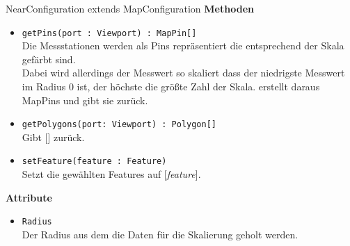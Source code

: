 \begin{Class}{NearConfiguration extends MapConfiguration}
    \textbf{Methoden}
    \begin{itemize}
        \item \texttt{getPins(port : Viewport) : MapPin[]}
        \\ Die Messstationen werden als Pins repräsentiert die entsprechend der Skala gefärbt sind.
        \\ Dabei wird allerdings der Messwert so skaliert dass der niedrigste Messwert im Radius 0 ist, der höchste die größte Zahl der Skala.
        erstellt daraus MapPins und gibt sie zurück.
        \item \texttt{getPolygons(port: Viewport) : Polygon[]}
        \\ Gibt [] zurück.
        \bigskip
        \item \texttt{setFeature(feature : Feature)}
        \\ Setzt die gewählten Features auf [\emph{feature}].
    \end{itemize}
    \textbf{Attribute}
    \begin{itemize}
        \item \texttt{Radius}
        \\ Der Radius aus dem die Daten für die Skalierung geholt werden.
    \end{itemize}
\end{Class}